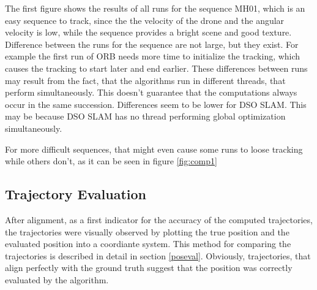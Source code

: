 The first figure shows the results of all runs for the sequence MH01, which is an easy sequence to track, since the the velocity of the drone and the 
angular velocity is low, while the sequence provides a bright scene and good texture. Difference between the runs for the sequence are not large, but they exist. 
For example the first run of ORB needs more time to initialize the tracking, which causes the tracking to start later and end earlier. These differences between runs
may result from the fact, that the algorithms run in different threads, that perform simultaneously. This doesn't guarantee that the computations always occur in the same succession. 
Differences seem to be lower for DSO SLAM. This may be because DSO SLAM has no thread performing global optimization simultaneously. 


For more difficult sequences, that might even cause some runs to loose tracking while others don't, as it can be seen in figure \ref{fig:comp1}

\subsection{Trajectory Evaluation}

	After alignment, as a first indicator for the accuracy of the computed trajectories, the trajectories were visually observed by 
	plotting the true position and the evaluated position into a coordiante system. This method 
    for comparing the trajectories is described in detail in section \ref{poseval}. Obviously, trajectories, that align perfectly with the ground truth
	suggest that the position was correctly evaluated by the algorithm. 
	

